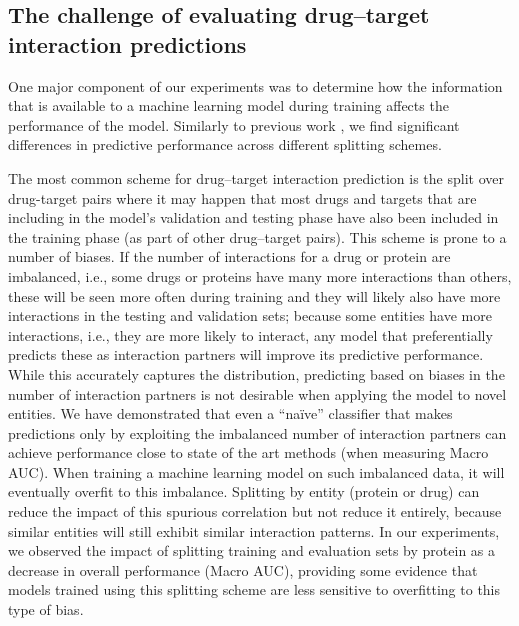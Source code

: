 \documentclass{bioinfo}
\renewcommand{\cite}{\citep}
\begin{document}


\subsection{The challenge of evaluating drug--target interaction
  predictions}

One major component of our experiments was to determine how the
information that is available to a machine learning model during
training affects the performance of the model. Similarly to previous
work \cite{MolTrans2020, DeepConvDTI2019}, we find significant
differences in predictive performance across different splitting
schemes.

The most common scheme for drug--target interaction prediction is the
split over drug-target pairs \cite{Survey2018} where it may happen
that most drugs and targets that are including in the model's
validation and testing phase have also been included in the training
phase (as part of other drug--target pairs). This scheme is prone to a
number of biases. If the number of interactions for a drug or protein
are imbalanced, i.e., some drugs or proteins have many more
interactions than others, these will be seen more often during
training and they will likely also have more interactions in the
testing and validation sets; because some entities have more
interactions, i.e., they are more likely to interact, any model that
preferentially predicts these as interaction partners will improve its
predictive performance. While this accurately captures the
distribution, predicting based on biases in the number of interaction
partners is not desirable when applying the model to novel
entities. We have demonstrated that even a ``na\"ive'' classifier that
makes predictions only by exploiting the imbalanced number of
interaction partners can achieve performance close to state of the art
methods (when measuring Macro AUC). When training a machine learning
model on such imbalanced data, it will eventually overfit to this
imbalance.  Splitting by entity (protein or drug) can reduce the
impact of this spurious correlation but not reduce it entirely,
because similar entities will still exhibit similar interaction
patterns. In our experiments, we observed the impact of splitting
training and evaluation sets by protein as a decrease in overall
performance (Macro AUC), providing some evidence that models trained
using this splitting scheme are less sensitive to overfitting to this
type of bias.
\end{document}
